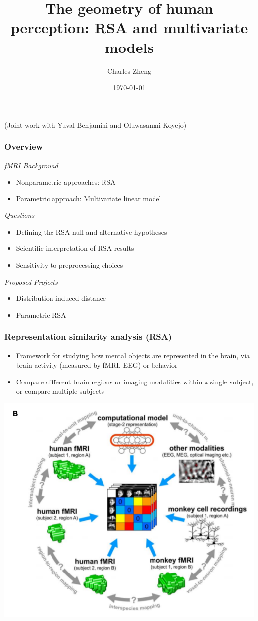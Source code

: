 \documentclass{beamer}
\title[Informal]{The geometry of human perception: RSA and multivariate models}
\author{Charles Zheng} %
\institute[Stanford] %
{Stanford University}
\date{\today} %
\begin{document}
\begin{frame}
\titlepage %
(Joint work with Yuval Benjamini and Oluwasanmi Koyejo)
\end{frame}

\begin{frame}
\frametitle{Overview}
\noindent\emph{fMRI Background}
\begin{itemize}
\item Nonparametric approaches: RSA
\item Parametric approach: Multivariate linear model
\end{itemize}
\noindent\emph{Questions}
\begin{itemize}
\item Defining the RSA null and alternative hypotheses
\item Scientific interpretation of RSA results
\item Sensitivity to preprocessing choices
\end{itemize}
\noindent\emph{Proposed Projects}
\begin{itemize}
\item Distribution-induced distance
\item Parametric RSA
\end{itemize}
\end{frame}

\begin{frame}
\frametitle{Representation similarity analysis (RSA)}
\begin{itemize}
\item Framework for studying how mental objects are represented in the brain,
via brain activity (measured by fMRI, EEG) or behavior
\item Compare different brain regions or imaging modalities within a single subject, or compare multiple subjects
\end{itemize}
\begin{center}
\includegraphics[scale = 0.3]{k08_b.png}
\end{center}
\end{frame}
\end{document}
